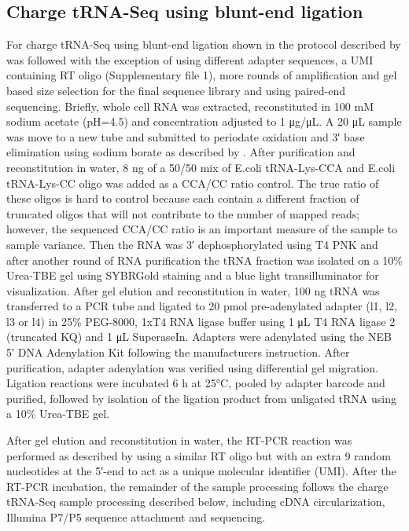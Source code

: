 \documentclass[9pt,lineno]{elife}
\begin{document}
\subsection{Charge tRNA-Seq using blunt-end ligation}
For charge tRNA-Seq using blunt-end ligation shown in  the protocol described by \cite{Behrens2021-gb} was followed with the exception of using different adapter sequences, a UMI containing RT oligo (Supplementary file 1), more rounds of amplification and gel based size selection for the final sequence library and using paired-end sequencing.
Briefly, whole cell RNA was extracted, reconstituted in 100 mM sodium acetate (pH=4.5) and concentration adjusted to 1 μg/μL.
A 20 μL sample was move to a new tube and submitted to periodate oxidation and 3′ base elimination using sodium borate as described by \cite{Evans2017-st}.
After purification and reconstitution in water, 8 ng of a 50/50 mix of E.coli tRNA-Lys-CCA and E.coli tRNA-Lys-CC oligo was added as a CCA/CC ratio control.
The true ratio of these oligos is hard to control because each contain a different fraction of truncated oligos that will not contribute to the number of mapped reads; however, the sequenced CCA/CC ratio is an important measure of the sample to sample variance.
Then the RNA was 3′ dephosphorylated using T4 PNK and after another round of RNA purification the tRNA fraction was isolated on a 10\% Urea-TBE gel using SYBRGold staining and a blue light transilluminator for visualization.
After gel elution and reconstitution in water, 100 ng tRNA was transferred to a PCR tube and ligated to 20 pmol pre-adenylated adapter (l1, l2, l3 or l4) in 25\% PEG-8000, 1xT4 RNA ligase buffer using 1 μL T4 RNA ligase 2 (truncated KQ) and 1 μL SuperaseIn.
Adapters were adenylated using the NEB 5′ DNA Adenylation Kit following the manufacturers instruction.
After purification, adapter adenylation was verified using differential gel migration.
Ligation reactions were incubated 6 h at 25°C, pooled by adapter barcode and purified, followed by isolation of the ligation product from unligated tRNA using a 10\% Urea-TBE gel.

After gel elution and reconstitution in water, the RT-PCR reaction was performed as described by \cite{Behrens2021-gb} using a similar RT oligo but with an extra 9 random nucleotides at the 5′-end to act as a unique molecular identifier (UMI).
After the RT-PCR incubation, the remainder of the sample processing follows the charge tRNA-Seq sample processing described below, including cDNA circularization, Illumina P7/P5 sequence attachment and sequencing.
\end{document}

